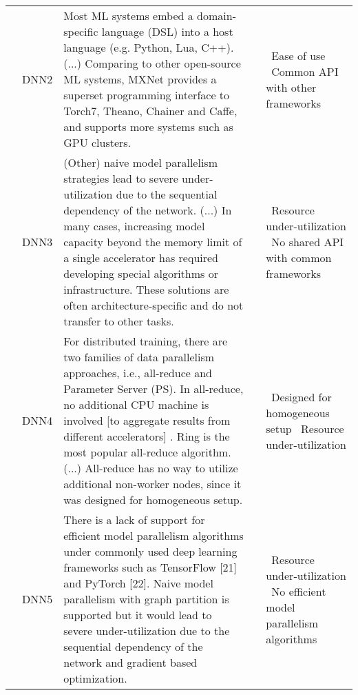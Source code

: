 {\begin{longtable}{|l|c|p{11.8cm}|p{0.6cm}|p{2cm}|}
         & DNN2 & Most ML systems embed a domain-specific language (DSL) into a host language (e.g. Python, Lua, C++).  (...)  Comparing to other open-source ML systems, MXNet provides a superset programming interface to Torch7, Theano, Chainer and Caffe, and supports more systems such as GPU clusters.
         & \cite{chen_mxnet_2015,huang_gpipe_2019}
	     & \textbullet\ Ease of use \newline \textbullet\ Common API with other frameworks \\ \cline{2-5}
         
         & DNN3 & (Other) naive model parallelism strategies lead to severe under-utilization due to the sequential dependency of the network. (...) In many cases, increasing model capacity beyond the memory limit of a single accelerator has required developing special algorithms or infrastructure. These solutions are often architecture-specific and do not transfer to other tasks.
         & \cite{huang_gpipe_2019,lepikhin_gshard_2020,jiang_unified_nodate,chen_mxnet_2015}
	     & \textbullet\ Resource under-utilization \newline \textbullet\ No shared API with common frameworks \\ \cline{2-5}
         
         & DNN4 & For distributed training, there are two families of data parallelism approaches, i.e., all-reduce and Parameter Server (PS). In all-reduce, no additional CPU machine is involved [to aggregate results from different accelerators] . Ring is the most popular all-reduce algorithm. (...) All-reduce has no way to utilize additional non-worker nodes, since it was designed for homogeneous setup.
         & \cite{jiang_unified_nodate,huang_gpipe_2019,lepikhin_gshard_2020}
	     & \textbullet\ Designed for homogeneous setup \newline \textbullet\ Resource under-utilization \\ \cline{2-5}
         
         & DNN5 & There is a lack of support for efficient model parallelism algorithms under commonly used deep learning frameworks such as TensorFlow [21] and PyTorch [22]. Naive model parallelism with graph partition is supported but it would lead to severe under-utilization due to the sequential dependency of the network and gradient based optimization.
         & \cite{lepikhin_gshard_2020,huang_gpipe_2019,jiang_unified_nodate}
	     & \textbullet\ Resource under-utilization \newline \textbullet\ No efficient model parallelism algorithms \\ \cline{2-5}
         

\end{longtable}}
